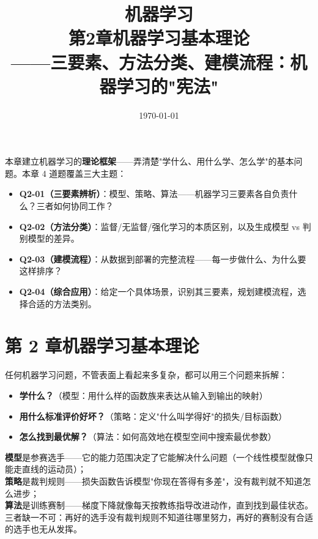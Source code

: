 \documentclass[a4paper,11pt]{ctexart}
\title{\textbf{机器学习\\第2章\quad 机器学习基本理论}\\[0.5em]
{\large\color{gray}——三要素、方法分类、建模流程：机器学习的"宪法"}}
\date{\today}
\begin{document}
\maketitle

\begin{beginnerbox}
    本章建立机器学习的\textbf{理论框架}——弄清楚"学什么、用什么学、怎么学"的基本问题。本章 4 道题覆盖三大主题：
    \begin{itemize}
        \item \textbf{Q2-01（三要素辨析）}：模型、策略、算法——机器学习三要素各自负责什么？三者如何协同工作？
        \item \textbf{Q2-02（方法分类）}：监督/无监督/强化学习的本质区别，以及生成模型 vs 判别模型的差异。
        \item \textbf{Q2-03（建模流程）}：从数据到部署的完整流程——每一步做什么、为什么要这样排序？
        \item \textbf{Q2-04（综合应用）}：给定一个具体场景，识别其三要素，规划建模流程，选择合适的方法类别。
    \end{itemize}
\end{beginnerbox}

\section{第 2 章\quad 机器学习基本理论}

任何机器学习问题，不管表面上看起来多复杂，都可以用三个问题来拆解：

\begin{itemize}
    \item \textbf{学什么？}（模型：用什么样的函数族来表达从输入到输出的映射）
    \item \textbf{用什么标准评价好坏？}（策略：定义"什么叫学得好"的损失/目标函数）
    \item \textbf{怎么找到最优解？}（算法：如何高效地在模型空间中搜索最优参数）
\end{itemize}

\begin{metaphorbox}
    \textbf{模型}是参赛选手——它的能力范围决定了它能解决什么问题（一个线性模型就像只能走直线的运动员）；\\
    \textbf{策略}是裁判规则——损失函数告诉模型"你现在答得有多差"，没有裁判就不知道怎么进步；\\
    \textbf{算法}是训练赛制——梯度下降就像每天按教练指导改进动作，直到找到最佳状态。\\
    三者缺一不可：再好的选手没有裁判规则不知道往哪里努力，再好的赛制没有合适的选手也无从发挥。
\end{metaphorbox}
\end{document}
